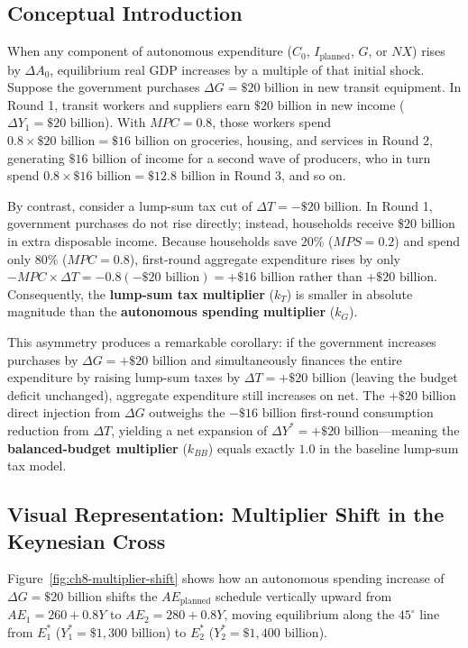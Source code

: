 \documentclass[11pt,letterpaper]{article}
\begin{document}
\subsection*{Conceptual Introduction}
When any component of autonomous expenditure ($C_0$, $I_{\text{planned}}$, $G$, or $NX$) rises by $\Delta A_0$, equilibrium real GDP increases by a multiple of that initial shock. Suppose the government purchases $\Delta G = \$20\text{ billion}$ in new transit equipment. In Round 1, transit workers and suppliers earn $\$20\text{ billion}$ in new income ($\Delta Y_1 = \$20\text{ billion}$). With $MPC = 0.8$, those workers spend $0.8 \times \$20\text{ billion} = \$16\text{ billion}$ on groceries, housing, and services in Round 2, generating $\$16\text{ billion}$ of income for a second wave of producers, who in turn spend $0.8 \times \$16\text{ billion} = \$12.8\text{ billion}$ in Round 3, and so on.

By contrast, consider a lump-sum tax cut of $\Delta T = -\$20\text{ billion}$. In Round 1, government purchases do not rise directly; instead, households receive $\$20\text{ billion}$ in extra disposable income. Because households save $20\%$ ($MPS = 0.2$) and spend only $80\%$ ($MPC = 0.8$), first-round aggregate expenditure rises by only $-MPC \times \Delta T = -0.8(-\$20\text{ billion}) = +\$16\text{ billion}$ rather than $+\$20\text{ billion}$. Consequently, the \textbf{lump-sum tax multiplier} ($k_T$) is smaller in absolute magnitude than the \textbf{autonomous spending multiplier} ($k_G$).

This asymmetry produces a remarkable corollary: if the government increases purchases by $\Delta G = +\$20\text{ billion}$ and simultaneously finances the entire expenditure by raising lump-sum taxes by $\Delta T = +\$20\text{ billion}$ (leaving the budget deficit unchanged), aggregate expenditure still increases on net. The $+\$20\text{ billion}$ direct injection from $\Delta G$ outweighs the $-\$16\text{ billion}$ first-round consumption reduction from $\Delta T$, yielding a net expansion of $\Delta Y^* = +\$20\text{ billion}$—meaning the \textbf{balanced-budget multiplier} ($k_{BB}$) equals exactly $1.0$ in the baseline lump-sum tax model.

\subsection*{Visual Representation: Multiplier Shift in the Keynesian Cross}
Figure~\ref{fig:ch8-multiplier-shift} shows how an autonomous spending increase of $\Delta G = \$20\text{ billion}$ shifts the $AE_{\text{planned}}$ schedule vertically upward from $AE_1 = 260 + 0.8Y$ to $AE_2 = 280 + 0.8Y$, moving equilibrium along the $45^\circ$ line from $E_1^*$ ($Y_1^* = \$1{,}300\text{ billion}$) to $E_2^*$ ($Y_2^* = \$1{,}400\text{ billion}$).
\end{document}
